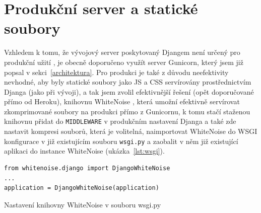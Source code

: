     \section{Produkční server a statické soubory}
    Vzhledem k tomu, že vývojový server poskytovaný Djangem není určený pro produkční užití \cite{django-managepy}, je obecně doporučeno využít server Gunicorn, který jsem již popsal v sekci~\ref{architektura}. Pro produkci je také z důvodu neefektivity nevhodné, aby byly statické soubory jako JS a CSS servírovány prostřednictvím Djanga (jako při vývoji), a tak jsem zvolil efektivnější řešení (opět doporučované přímo od Heroku), knihovnu WhiteNoise \cite{whitenoise}, která umožní efektivně servírovat zkomprimované soubory na produkci přímo z Gunicornu, k tomu stačí staženou knihovnu přidat do \verb|MIDDLEWARE| v produkčním nastavení Djanga a také zde nastavit kompresi souborů, která je volitelná, naimportovat WhiteNoise do WSGI konfigurace v již existujícím souboru \verb|wsgi.py| a zaobalit v něm již existující aplikaci do instance WhiteNoise (ukázka~\ref{lst:wsgi}).
    
    \begin{listing}[ht]
    	\begin{verbatim}
from whitenoise.django import DjangoWhiteNoise
...
application = DjangoWhiteNoise(application)
    	\end{verbatim}
    	\caption{Nastavení knihovny WhiteNoise v souboru wsgi.py}\label{lst:wsgi}
    \end{listing}
    
